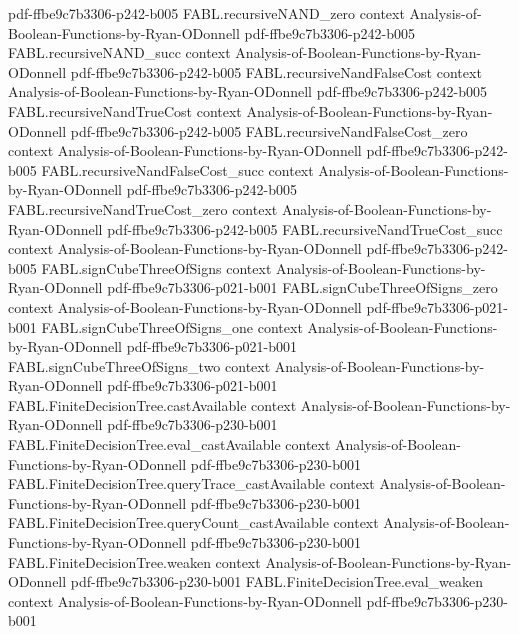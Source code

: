 \begin{theorem}
  {pdf-ffbe9c7b3306-p242-b005}
\proofstep
  {FABL.recursiveNAND_zero}
  {context}
  {Analysis-of-Boolean-Functions-by-Ryan-ODonnell}
  {pdf-ffbe9c7b3306-p242-b005}
\proofstep
  {FABL.recursiveNAND_succ}
  {context}
  {Analysis-of-Boolean-Functions-by-Ryan-ODonnell}
  {pdf-ffbe9c7b3306-p242-b005}
\proofstep
  {FABL.recursiveNandFalseCost}
  {context}
  {Analysis-of-Boolean-Functions-by-Ryan-ODonnell}
  {pdf-ffbe9c7b3306-p242-b005}
\proofstep
  {FABL.recursiveNandTrueCost}
  {context}
  {Analysis-of-Boolean-Functions-by-Ryan-ODonnell}
  {pdf-ffbe9c7b3306-p242-b005}
\proofstep
  {FABL.recursiveNandFalseCost_zero}
  {context}
  {Analysis-of-Boolean-Functions-by-Ryan-ODonnell}
  {pdf-ffbe9c7b3306-p242-b005}
\proofstep
  {FABL.recursiveNandFalseCost_succ}
  {context}
  {Analysis-of-Boolean-Functions-by-Ryan-ODonnell}
  {pdf-ffbe9c7b3306-p242-b005}
\proofstep
  {FABL.recursiveNandTrueCost_zero}
  {context}
  {Analysis-of-Boolean-Functions-by-Ryan-ODonnell}
  {pdf-ffbe9c7b3306-p242-b005}
\proofstep
  {FABL.recursiveNandTrueCost_succ}
  {context}
  {Analysis-of-Boolean-Functions-by-Ryan-ODonnell}
  {pdf-ffbe9c7b3306-p242-b005}
\proofstep
  {FABL.signCubeThreeOfSigns}
  {context}
  {Analysis-of-Boolean-Functions-by-Ryan-ODonnell}
  {pdf-ffbe9c7b3306-p021-b001}
\proofstep
  {FABL.signCubeThreeOfSigns_zero}
  {context}
  {Analysis-of-Boolean-Functions-by-Ryan-ODonnell}
  {pdf-ffbe9c7b3306-p021-b001}
\proofstep
  {FABL.signCubeThreeOfSigns_one}
  {context}
  {Analysis-of-Boolean-Functions-by-Ryan-ODonnell}
  {pdf-ffbe9c7b3306-p021-b001}
\proofstep
  {FABL.signCubeThreeOfSigns_two}
  {context}
  {Analysis-of-Boolean-Functions-by-Ryan-ODonnell}
  {pdf-ffbe9c7b3306-p021-b001}
\proofstep
  {FABL.FiniteDecisionTree.castAvailable}
  {context}
  {Analysis-of-Boolean-Functions-by-Ryan-ODonnell}
  {pdf-ffbe9c7b3306-p230-b001}
\proofstep
  {FABL.FiniteDecisionTree.eval_castAvailable}
  {context}
  {Analysis-of-Boolean-Functions-by-Ryan-ODonnell}
  {pdf-ffbe9c7b3306-p230-b001}
\proofstep
  {FABL.FiniteDecisionTree.queryTrace_castAvailable}
  {context}
  {Analysis-of-Boolean-Functions-by-Ryan-ODonnell}
  {pdf-ffbe9c7b3306-p230-b001}
\proofstep
  {FABL.FiniteDecisionTree.queryCount_castAvailable}
  {context}
  {Analysis-of-Boolean-Functions-by-Ryan-ODonnell}
  {pdf-ffbe9c7b3306-p230-b001}
\proofstep
  {FABL.FiniteDecisionTree.weaken}
  {context}
  {Analysis-of-Boolean-Functions-by-Ryan-ODonnell}
  {pdf-ffbe9c7b3306-p230-b001}
\proofstep
  {FABL.FiniteDecisionTree.eval_weaken}
  {context}
  {Analysis-of-Boolean-Functions-by-Ryan-ODonnell}
  {pdf-ffbe9c7b3306-p230-b001}
\proofstep

\end{theorem}
